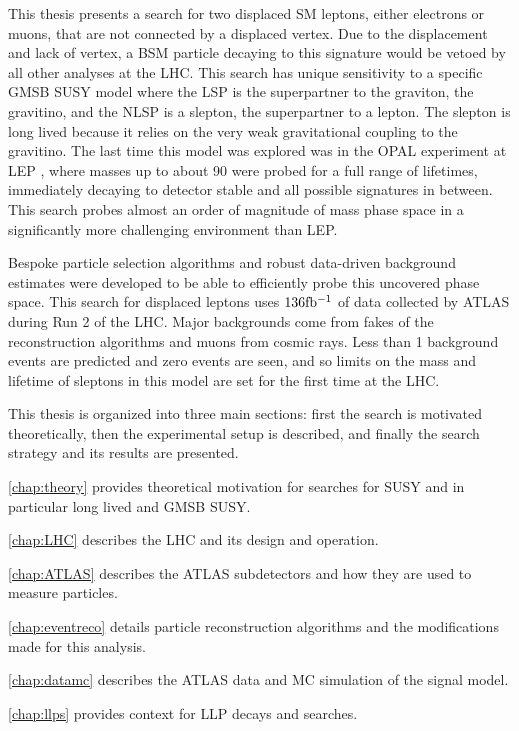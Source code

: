 This thesis presents a search for two displaced \ac{SM} leptons, either electrons or muons, that are not connected by a displaced vertex. Due to the displacement and lack of vertex, a \ac{BSM} particle decaying to this signature would be vetoed by all other analyses at the \ac{LHC}. This search has unique sensitivity to a specific \acf{GMSB} \acf{SUSY} model where the \acf{LSP} is the superpartner to the graviton, the gravitino, and the \acf{NLSP} is a slepton, the superpartner to a lepton. The slepton is long lived because it relies on the very weak gravitational coupling to the gravitino. The last time this model was explored was in the OPAL experiment at \acf{LEP} \cite{opal}, where masses up to about 90 \GeV were probed for a full range of lifetimes, immediately decaying to detector stable and all possible signatures in between. This search probes almost an order of magnitude of mass phase space in a significantly more challenging environment than \ac{LEP}.

Bespoke particle selection algorithms and robust data-driven background estimates were developed to be able to efficiently probe this uncovered phase space. This search for displaced leptons uses $136 \mbox{fb\(^{-1}\)}$ of data collected by \ac{ATLAS} during Run 2 of the \ac{LHC}. Major backgrounds come from fakes of the reconstruction algorithms and muons from cosmic rays. Less than 1 background events are predicted and zero events are seen, and so limits on the mass and lifetime of sleptons in this model are set for the first time at the \ac{LHC}. 

This thesis is organized into three main sections: first the search is motivated theoretically, then the experimental setup is described, and finally the search strategy and its results are presented.

\autoref{chap:theory} provides theoretical motivation for searches for \ac{SUSY} and in particular long lived and \ac{GMSB} \ac{SUSY}.

\autoref{chap:LHC} describes the \ac{LHC} and its design and operation.

\autoref{chap:ATLAS} describes the \ac{ATLAS} subdetectors and how they are used to measure particles.

\autoref{chap:eventreco} details particle reconstruction algorithms and the modifications made for this analysis.

\autoref{chap:datamc} describes the \ac{ATLAS} data and \acf{MC} simulation of the signal model.

\autoref{chap:llps} provides context for \ac{LLP} decays and searches.

